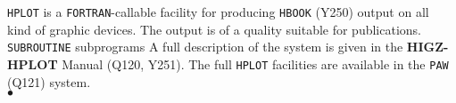                      
                   
\Submitter{}                           
                 
{\tt HPLOT} is a {\tt FORTRAN}-callable facility for producing
{\tt HBOOK} (Y250) output on all kind of graphic devices.
The output is of a quality suitable for publications.
\Structure
{\tt SUBROUTINE} subprograms
\Usage
A full description of the system is given in the {\bf HIGZ-HPLOT}
Manual (Q120, Y251).
The full {\tt HPLOT} facilities are available in the {\tt PAW}
(Q121) system.
\\ $\bullet$
